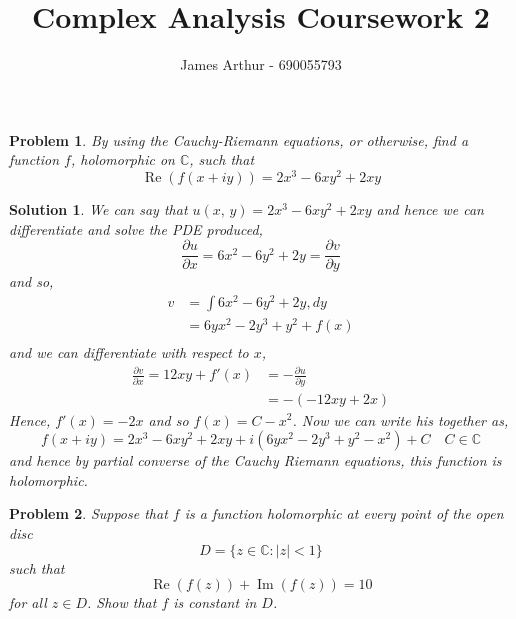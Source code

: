 \documentclass{article}
\title{Complex Analysis Coursework 2}
\author{James Arthur - 690055793}
\renewcommand{\Re}{\operatorname{Re}}
\renewcommand{\Im}{\operatorname{Im}}
\newcommand{\C}{\mathbb{C}}
\newcommand{\pd}[2]{\frac{\partial #1}{\partial #2}}
\newtheorem{problem}{Problem}
\newtheorem{solution}{Solution}
\begin{document}
\maketitle

\begin{problem}
  By using the Cauchy-Riemann equations, or otherwise, find a function $f$, holomorphic on $\C$, such that
  $$ \Re(f(x + iy)) = 2x^3 - 6xy^2 + 2xy $$
\end{problem}


\begin{solution}
  We can say that $u(x,\, y) = 2x^3 - 6xy^2 + 2xy$ and hence we can differentiate and solve the PDE produced,
  $$ \pd{u}{x} = 6x^2 - 6y^2 + 2y = \pd{v}{y} $$
  and so,
  \begin{align*}
    v &= \int {6x^2 - 6y^2 + 2y , dy}\\
    &= 6yx^2 - 2y^3 + y^2 + f(x)\\
  \end{align*}
  and we can differentiate with respect to $x$,
  \begin{align*}
    \pd{v}{x} = 12xy + f'(x) &= -\pd{u}{y}\\
    &= - (- 12xy + 2x)
  \end{align*}
  Hence, $f'(x) = -2x$ and so $f(x) = C - x^2$. Now we can write his together as,
  $$ f(x + iy) = 2x^3 - 6xy^2 + 2xy + i(6yx^2 - 2y^3 + y^2 - x^2) + C \quad C \in \C$$
  and hence by partial converse of the Cauchy Riemann equations, this function is holomorphic.
\end{solution}

\newpage
\begin{problem}
  Suppose that $f$ is a function holomorphic at every point of the open disc
  $$ D = \{ z \in \C : |z| < 1 \} $$
  such that
  $$\Re(f(z)) + \Im(f(z)) = 10$$
  for all $z \in D$. Show that $f$ is constant in $D$.
\end{problem}
\end{document}
